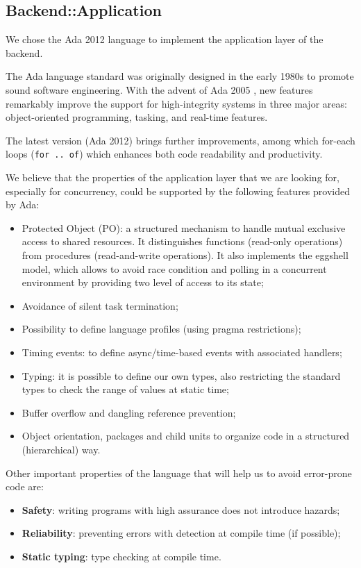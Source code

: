 \subsection{Backend::Application}
We chose the Ada 2012 language \cite{taft2012ada}
to implement the application layer of the backend.

The Ada language standard was originally designed in the early 1980s to promote
sound software engineering. With the advent of Ada 2005 \cite{taft2006ada},
new features
remarkably improve the support for high-integrity systems in three major
areas: object-oriented programming, tasking, and real-time features.

The latest version (Ada 2012) brings further improvements, among which for-each
loops (\texttt{for .. of}) which enhances both code readability and
productivity.

We believe that the properties of the application layer
that we are looking for, especially for concurrency, could be supported by the
following features provided by Ada:
\begin{itemize}
  \item Protected Object (PO): a structured mechanism to handle
        mutual exclusive access to shared resources.
        It distinguishes functions (read-only
        operations) from procedures (read-and-write operations). It also
        implements the eggshell model, which allows to avoid race condition and
        polling in a concurrent environment by providing two level of access
        to its state;
  \item Avoidance of silent task termination;
  \item Possibility to define language profiles (using pragma restrictions);
  \item Timing events: to define async/time-based events with associated
        handlers;
  \item Typing: it is possible to define our own types, also restricting
  the standard types to check the range of values at static time;
  \item Buffer overflow and dangling reference prevention;
  \item Object orientation, packages and child units to organize code in a
  structured (hierarchical) way.
\end{itemize}

Other important properties of the language that will help us to avoid
error-prone code are:
\begin{itemize}
  \item \textbf{Safety}: writing programs with high assurance does not
        introduce hazards;
  \item \textbf{Reliability}: preventing errors with detection at compile time
        (if possible);
  \item \textbf{Static typing}: type checking at compile time.
\end{itemize}

